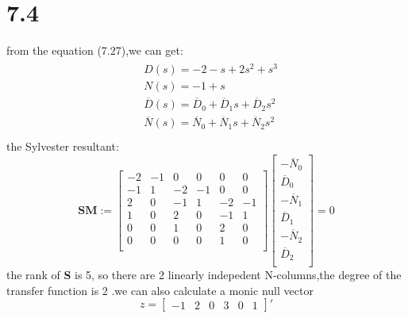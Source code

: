 \documentclass{article}
\begin{document}
\section*{7.4}
from the equation (7.27),we can get:
\[
\begin{aligned}
\begin{split}
&D(s)=-2-s+2s^2+s^3\\
&N(s)=-1+s\\
&\overline{D}(s)=\overline{D}_0+\overline{D}_1s+\overline{D}_2s^2\\
&\overline{N}(s)=\overline{N}_0+\overline{N}_1s+\overline{N}_2s^2\\
\end{split}
\end{aligned}
\]
the Sylvester resultant:
\[
\textbf{SM}:=
\left[
\begin{array}{cccccc}
-2 &-1 & 0  & 0 & 0 & 0\\
-1 &1  & -2 & -1& 0 & 0\\
2  &0  & -1 & 1 & -2& -1\\
1  &0  & 2  & 0 & -1& 1\\
0  &0  & 1  & 0 & 2 & 0\\
0  &0  & 0  & 0 & 1 & 0\\
\end{array}
\right]
\left[
    \begin{array}{c}
    -\overline{N}_0\\
    \overline{D}_0\\
    -\overline{N}_1\\
    \overline{D}_1\\
    -\overline{N}_2\\
    \overline{D}_2\\
    \end{array}
\right]=0
\] 
the rank of \textbf{S} is 5, so  there are 2 linearly indepedent N-columns,the degree of the transfer function is 2 .we can also calculate a monic null vector 
\[
z=\left[
    \begin{array}{cccccc}
        -1 & 2 & 0 & 3 & 0 & 1
    \end{array}
\right]'   
\]
\end{document}
